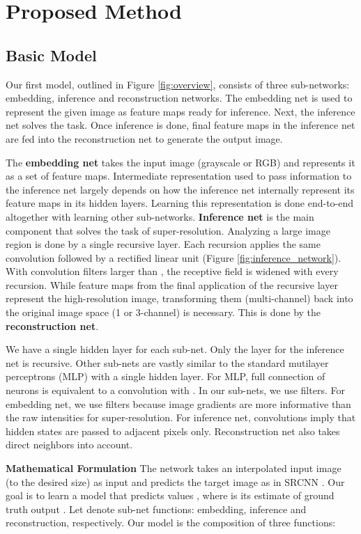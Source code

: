 \documentclass[10pt,twocolumn,letterpaper]{article}
\begin{document}
\section{Proposed Method}
\subsection{Basic Model}

Our first model, outlined in Figure \ref{fig:overview}, consists of three sub-networks: embedding, inference and reconstruction networks. The embedding net is used to represent the given image as feature maps ready for inference. Next, the inference net solves the task. Once inference is done, final feature maps in the inference net are fed into the reconstruction net to generate the output image.

The \textbf{embedding net} takes the input image (grayscale or RGB) and represents it as a set of feature maps. Intermediate representation used to pass information to the inference net largely depends on how the inference net internally represent its feature maps in its hidden layers. Learning this representation is done end-to-end altogether with learning other sub-networks. \textbf{Inference net} is the main component that solves the task of super-resolution. Analyzing a large image region is done by a single recursive layer. Each recursion applies the same convolution followed by a rectified linear unit (Figure \ref{fig:inference_network}). With convolution filters larger than ,  the receptive field is widened with every recursion. While feature maps from the final application of the recursive layer represent the high-resolution image, transforming them (multi-channel) back into the original image space (1 or 3-channel) is necessary. This is done by the \textbf{reconstruction net}.  

We have a single hidden layer for each sub-net. Only the layer for the inference net is recursive. Other sub-nets are vastly similar to the standard mutilayer perceptrons (MLP) with a single hidden layer. For MLP, full connection of  neurons is equivalent to a convolution with . In our sub-nets, we use  filters. For embedding net, we use  filters because image gradients are more informative than the raw intensities for super-resolution. For inference net,  convolutions imply that hidden states are passed to adjacent pixels only. Reconstruction net also takes direct neighbors into account.

\textbf{Mathematical Formulation} The network takes an interpolated input image (to the desired size) as input  and predicts the target image  as in SRCNN \cite{dong2014image}. Our goal is to learn a model  that predicts values , where  is its estimate of ground truth output . Let  denote sub-net functions: embedding, inference and reconstruction, respectively. Our model is the composition of three functions: 
 
\end{document}
